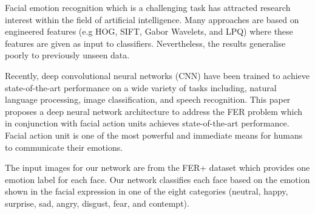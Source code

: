 Facial emotion recognition which is a challenging task has attracted research interest within the field of artificial intelligence. Many approaches are based on engineered features (e.g HOG, SIFT, Gabor Wavelets, and LPQ) where these features are given as input to classifiers. Nevertheless, the results generalise poorly to previously unseen data.

Recently, deep convolutional neural networks (CNN) have been trained to achieve state-of-the-art performance on a wide variety of tasks including, natural language processing, image classification, and speech recognition. This paper proposes a deep neural network architecture to address the FER problem which in conjunction with facial action units achieves state-of-the-art performance. Facial action unit is one of the most powerful and immediate means for humans to communicate their emotions.

The input images for our network are from the FER+ dataset which provides one emotion label for each face. Our network classifies each face based on the emotion shown in the facial expression in one of the eight categories (neutral, happy, surprise, sad, angry, disgust, fear, and contempt). 

\afterpage{\blankpage}